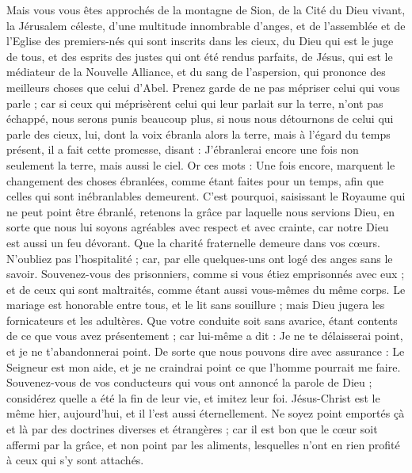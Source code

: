\begin{multicols}{2}
Mais vous vous êtes approchés de la montagne de Sion, de la Cité du Dieu vivant, la Jérusalem céleste, d'une multitude innombrable d'anges,
et de l'assemblée et de l'Eglise des premiers-nés qui sont inscrits dans les cieux, du Dieu qui est le juge de tous, et des esprits des justes qui ont été rendus parfaits,
de Jésus, qui est le médiateur de la Nouvelle Alliance, et du sang de l'aspersion, qui prononce des meilleurs choses que celui d'Abel.
Prenez garde de ne pas mépriser celui qui vous parle ; car si ceux qui méprisèrent celui qui leur parlait sur la terre, n'ont pas échappé, nous serons punis beaucoup plus, si nous nous détournons de celui qui parle des cieux,
lui, dont la voix ébranla alors la terre, mais à l'égard du temps présent, il a fait cette promesse, disant : J'ébranlerai encore une fois non seulement la terre, mais aussi le ciel.
Or ces mots : Une fois encore, marquent le changement des choses ébranlées, comme étant faites pour un temps, afin que celles qui sont inébranlables demeurent.
C'est pourquoi, saisissant le Royaume qui ne peut point être ébranlé, retenons la grâce par laquelle nous servions Dieu, en sorte que nous lui soyons agréables avec respect et avec crainte,
car notre Dieu est aussi un feu dévorant.
\VerseOne{}Que la charité fraternelle demeure dans vos cœurs.
N'oubliez pas l'hospitalité ; car, par elle quelques-uns ont logé des anges sans le savoir.
Souvenez-vous des prisonniers, comme si vous étiez emprisonnés avec eux ; et de ceux qui sont maltraités, comme étant aussi vous-mêmes du même corps.
Le mariage est honorable entre tous, et le lit sans souillure ; mais Dieu jugera les fornicateurs et les adultères.
Que votre conduite soit sans avarice, étant contents de ce que vous avez présentement ; car lui-même a dit : Je ne te délaisserai point, et je ne t'abandonnerai point.
De sorte que nous pouvons dire avec assurance : Le Seigneur est mon aide, et je ne craindrai point ce que l'homme pourrait me faire.
Souvenez-vous de vos conducteurs qui vous ont annoncé la parole de Dieu ; considérez quelle a été la fin de leur vie, et imitez leur foi.
Jésus-Christ est le même hier, aujourd'hui, et il l'est aussi éternellement.
Ne soyez point emportés çà et là par des doctrines diverses et étrangères ; car il est bon que le cœur soit affermi par la grâce, et non point par les aliments, lesquelles n'ont en rien profité à ceux qui s'y sont attachés.

\end{multicols}
